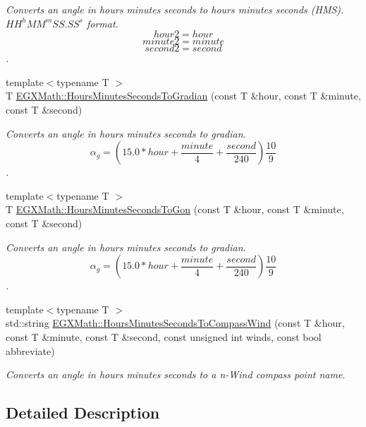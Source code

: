 \begin{DoxyCompactItemize}
\begin{DoxyCompactList}\small\item\em Converts an angle in hours minutes seconds to hours minutes seconds (H\+MS). ${HH}^h{MM}^m{SS.SS}^s$ format. \[hour2 = hour \] \[minute2 = minute\] \[second2 = second\]. \end{DoxyCompactList}\item 
{\footnotesize template$<$typename T $>$ }\\T \mbox{\hyperlink{group___e_g_x_math-_angle_conversions-_hours_minutes_seconds_ga1731e750f3e5561313ee9d22adff747e}{E\+G\+X\+Math\+::\+Hours\+Minutes\+Seconds\+To\+Gradian}} (const T \&hour, const T \&minute, const T \&second)
\begin{DoxyCompactList}\small\item\em Converts an angle in hours minutes seconds to gradian. \[\alpha_{g}=(15.0 * hour + \frac{minute}{4} + \frac{second}{240})\frac{10}{9}\]. \end{DoxyCompactList}\item 
{\footnotesize template$<$typename T $>$ }\\T \mbox{\hyperlink{group___e_g_x_math-_angle_conversions-_hours_minutes_seconds_ga356f1e89c3ea35a9d46967644d4ddfd3}{E\+G\+X\+Math\+::\+Hours\+Minutes\+Seconds\+To\+Gon}} (const T \&hour, const T \&minute, const T \&second)
\begin{DoxyCompactList}\small\item\em Converts an angle in hours minutes seconds to gradian. \[\alpha_{g}=(15.0 * hour + \frac{minute}{4} + \frac{second}{240})\frac{10}{9}\]. \end{DoxyCompactList}\item 
{\footnotesize template$<$typename T $>$ }\\std\+::string \mbox{\hyperlink{group___e_g_x_math-_angle_conversions-_hours_minutes_seconds_gacb8fc46aacbc82db6852dfc9c42c77df}{E\+G\+X\+Math\+::\+Hours\+Minutes\+Seconds\+To\+Compass\+Wind}} (const T \&hour, const T \&minute, const T \&second, const unsigned int winds, const bool abbreviate)
\begin{DoxyCompactList}\small\item\em Converts an angle in hours minutes seconds to a n-\/\+Wind compass point name. \end{DoxyCompactList}\end{DoxyCompactItemize}


\subsection{Detailed Description}


